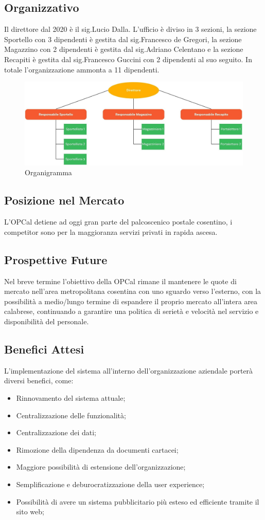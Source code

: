 \subsection{Organizzativo}
Il direttore dal 2020 è il sig.Lucio Dalla. L'ufficio è diviso in 3 sezioni, la sezione Sportello con 3 dipendenti è gestita 
dal sig.Francesco de Gregori, la sezione Magazzino con 2 dipendenti è gestita dal sig.Adriano Celentano e la sezione Recapiti 
è gestita dal sig.Francesco Guccini con 2 dipendenti al suo seguito. In totale l'organizzazione ammonta a 11 dipendenti.
\begin{figure}[h]
  \centering
  \includegraphics[width=0.8\linewidth]{assets/organigramma.jpg}
  \caption{Organigramma}
\end{figure}
\subsection{Posizione nel Mercato}
L'OPCal detiene ad oggi gran parte del palcoscenico postale cosentino, i competitor sono per la maggioranza servizi privati in rapida ascesa.
\subsection{Prospettive Future}
Nel breve termine l'obiettivo della OPCal rimane il mantenere le quote di mercato nell'area metropolitana cosentina con uno sguardo 
verso l'esterno, con la possibilità a medio/lungo termine di espandere il proprio mercato all'intera area calabrese, continuando a 
garantire una politica di serietà e velocità nel servizio e disponibilità del personale.
\subsection{Benefici Attesi}
L'implementazione del sistema all'interno dell'organizzazione aziendale porterà diversi benefici, come:
\begin{itemize}
  \item Rinnovamento del sistema attuale;
  \item Centralizzazione delle funzionalità;
  \item Centralizzazione dei dati;
  \item Rimozione della dipendenza da documenti cartacei;
  \item Maggiore possibilità di estensione dell'organizzazione;
  \item Semplificazione e deburocratizzazione della user experience;
  \item Possibilità di avere un sistema pubblicitario più esteso ed efficiente tramite il sito web;

\end{itemize}
